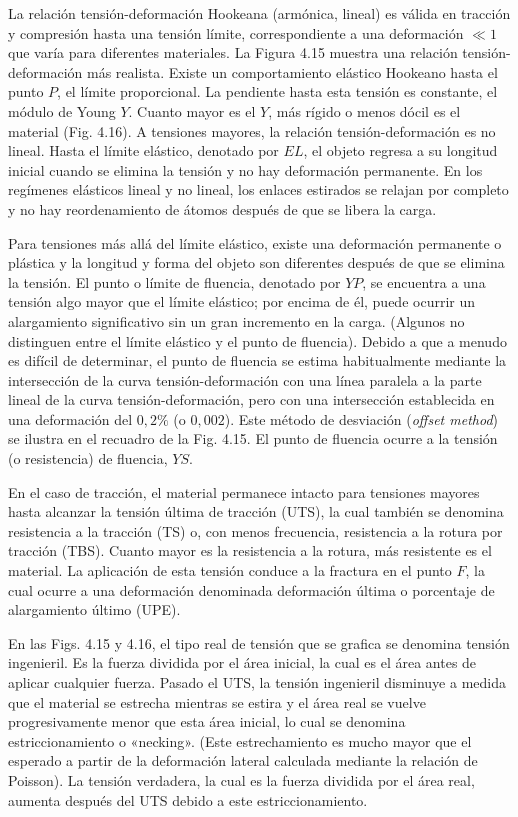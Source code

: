 \documentclass[12pt]{book}
\begin{document}
La relación tensión-deformación Hookeana (armónica, lineal) es válida en tracción y compresión hasta una tensión límite, correspondiente a una deformación $\ll 1$ que varía para diferentes materiales. La Figura 4.15 muestra una relación tensión-deformación más realista. Existe un comportamiento elástico Hookeano hasta el punto $P$, el límite proporcional. La pendiente hasta esta tensión es constante, el módulo de Young $Y$. Cuanto mayor es el $Y$, más rígido o menos dócil es el material (Fig. 4.16). A tensiones mayores, la relación tensión-deformación es no lineal. Hasta el límite elástico, denotado por $EL$, el objeto regresa a su longitud inicial cuando se elimina la tensión y no hay deformación permanente. En los regímenes elásticos lineal y no lineal, los enlaces estirados se relajan por completo y no hay reordenamiento de átomos después de que se libera la carga.

Para tensiones más allá del límite elástico, existe una deformación permanente o plástica y la longitud y forma del objeto son diferentes después de que se elimina la tensión. El punto o límite de fluencia, denotado por $YP$, se encuentra a una tensión algo mayor que el límite elástico; por encima de él, puede ocurrir un alargamiento significativo sin un gran incremento en la carga. (Algunos no distinguen entre el límite elástico y el punto de fluencia). Debido a que a menudo es difícil de determinar, el punto de fluencia se estima habitualmente mediante la intersección de la curva tensión-deformación con una línea paralela a la parte lineal de la curva tensión-deformación, pero con una intersección establecida en una deformación del $0,2\%$ (o $0,002$). Este método de desviación (\textit{offset method}) se ilustra en el recuadro de la Fig. 4.15. El punto de fluencia ocurre a la tensión (o resistencia) de fluencia, $YS$.

En el caso de tracción, el material permanece intacto para tensiones mayores hasta alcanzar la tensión última de tracción (UTS), la cual también se denomina resistencia a la tracción (TS) o, con menos frecuencia, resistencia a la rotura por tracción (TBS). Cuanto mayor es la resistencia a la rotura, más resistente es el material. La aplicación de esta tensión conduce a la fractura en el punto $F$, la cual ocurre a una deformación denominada deformación última o porcentaje de alargamiento último (UPE).

En las Figs. 4.15 y 4.16, el tipo real de tensión que se grafica se denomina tensión ingenieril. Es la fuerza dividida por el área inicial, la cual es el área antes de aplicar cualquier fuerza. Pasado el UTS, la tensión ingenieril disminuye a medida que el material se estrecha mientras se estira y el área real se vuelve progresivamente menor que esta área inicial, lo cual se denomina estriccionamiento o «necking». (Este estrechamiento es mucho mayor que el esperado a partir de la deformación lateral calculada mediante la relación de Poisson). La tensión verdadera, la cual es la fuerza dividida por el área real, aumenta después del UTS debido a este estriccionamiento.
\end{document}

